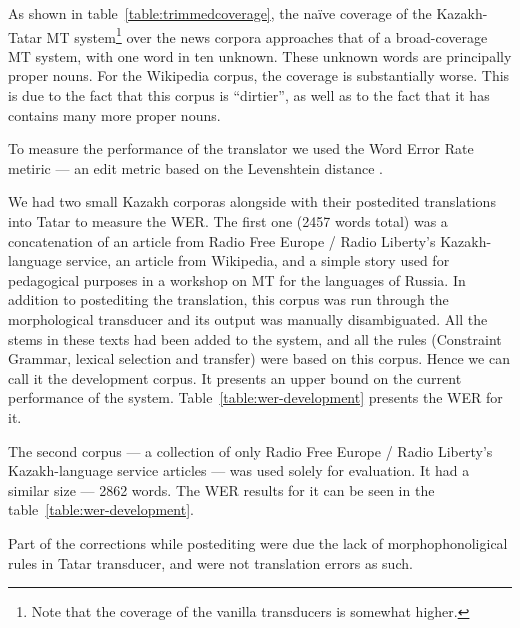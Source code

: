 \documentclass[11pt]{article}
\begin{document}
As shown in table~\ref{table:trimmedcoverage}, the naïve coverage of the Kazakh-Tatar MT system\footnote{Note that the coverage of the vanilla transducers is somewhat higher.} over the news corpora approaches that of a broad-coverage MT system, with one word in ten unknown.  These unknown words are principally proper nouns.  For the Wikipedia corpus, the coverage is substantially worse.  This is due to the fact that this corpus is ``dirtier'', as well as to the fact that it has contains many more proper nouns.

To measure the performance of the translator we used the Word Error Rate metiric --- an edit metric based on the
Levenshtein distance \citep{levenshtein/1966}.

We had two small Kazakh corporas alongside with their postedited translations into Tatar to measure the WER.
The first one (2457 words total) was a concatenation of an article from Radio Free Europe / Radio Liberty's
Kazakh-language service, an article from Wikipedia, and a simple story used for pedagogical purposes in a workshop
on MT for the languages of Russia. In addition to postediting the translation, this corpus was run through the
morphological transducer and its output was manually disambiguated. All the stems in these texts had been added to
the system, and all the rules (Constraint Grammar, lexical selection and transfer) were based on this corpus.
Hence we can call it the development corpus. It presents an upper bound on the current performance
of the system. Table~\ref{table:wer-development} presents the WER for it. %

The second corpus --- a collection of only Radio Free Europe / Radio Liberty's
Kazakh-language service articles --- was used solely for evaluation. It had a similar size --- 2862 words.
The WER results for it can be seen in the table~\ref{table:wer-development}. %

Part of the corrections while postediting were due the lack of morphophonoligical rules in Tatar transducer,
and were not translation errors as such.


\end{document}
